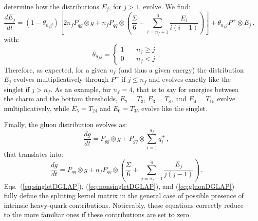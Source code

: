 \documentclass[10pt,a4paper]{article}
\begin{document}
determine how the distributions $E_j$, for $j>1$,
evolve. We find:
\begin{equation}
  \frac{dE_j}{dt}= (1-\theta_{n_fj})\left[2n_f P_{qg}\otimes
    g+n_fP_{qq}\otimes
    \left(\frac{\Sigma}{6}+\sum_{i=n_f+1}^6\frac{E_i}{i(i-1)}\right)\right]+\theta_{n_fj}P^+\otimes
  E_j\,,
\label{eq:nonsingletDGLAP}
\end{equation}
with:
\begin{equation}
\theta_{n_fj}=\left\{
\begin{array}{ll}
1   & \quad n_f\geq j\\
0 & \quad n_f < j
\end{array}
\right.\,. 
\end{equation}
Therefore, as expected, for a given $n_f$ (and thus a given energy)
the distribution $E_j$ evolves multiplicatively through $P^+$ if
$j\leq n_f$ and evolves exactly like the singlet if $j>n_f$. As an
example, for $n_f=4$, that is to say for energies between the charm
and the bottom thresholds, $E_2=T_3$, $E_3=T_8$, and $E_4=T_{15}$
evolve multiplicatively, while $E_5=T_{24}$ and $E_6=T_{35}$ evolve
like the singlet.

Finally, the gluon distribution evolves as:
\begin{equation}
\frac{dg}{dt}= P_{gg}\otimes g+
P_{gq}\otimes \sum_{i=1}^{n_f} q_i^+\,,
\end{equation}
that translates into:
\begin{equation}
\frac{dg}{dt}= P_{gg}\otimes g+n_fP_{gq}\otimes
\left(\frac{\Sigma}{6}+\sum_{j=n_f+1}^6\frac{E_j}{j(j-1)}\right)\,.
\label{eq:gluonDGLAP}
\end{equation}
Eqs.~(\ref{eq:singletDGLAP}), (\ref{eq:nonsingletDGLAP}), and
(\ref{eq:gluonDGLAP}) fully define the splitting kernel matrix in the
general case of possible presence of intrinsic heavy-quark
contributions. Noticeably, these equations correctly reduce to the
more familiar ones if these contributions are set to zero.
\end{document}
